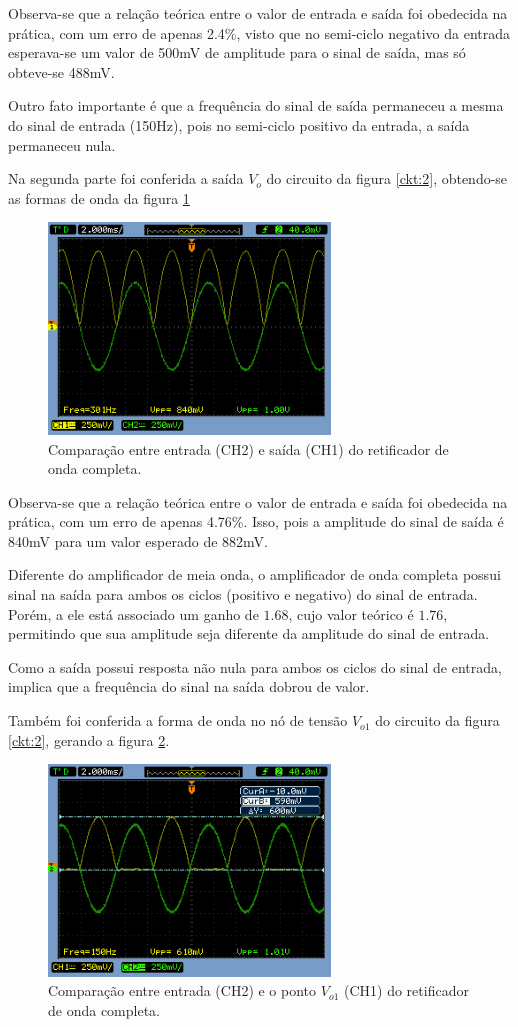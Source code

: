 Observa-se que a relação teórica entre o valor de entrada e saída foi obedecida na prática, com um erro de apenas 2.4\%, visto que no semi-ciclo negativo da entrada esperava-se um valor de 500mV de amplitude para o sinal de saída, mas só obteve-se 488mV. 

Outro fato importante é que a frequência do sinal de saída permaneceu a mesma do sinal de entrada (150Hz), pois no semi-ciclo positivo da entrada, a saída permaneceu nula.

Na segunda parte foi conferida a saída $V_o$ do circuito da figura \ref{ckt:2}, obtendo-se as formas de onda da figura \ref{fig2}

\begin{figure}[H] 
\centering
\includegraphics[width=7.5cm]{images/VO_2.png}
\caption{Comparação entre entrada (CH2) e saída (CH1) do retificador de onda completa.}
\label{fig2} 
\end{figure}

Observa-se que a relação teórica entre o valor de entrada e saída foi obedecida na prática, com um erro de apenas 4.76\%. Isso, pois a amplitude do sinal de saída é 840mV para um valor esperado de 882mV. 

Diferente do amplificador de meia onda, o amplificador de onda completa possui sinal na saída para ambos os ciclos (positivo e negativo) do sinal de entrada. Porém, a ele está associado um ganho de $1.68$, cujo valor teórico é $1.76$, permitindo que sua amplitude seja diferente da amplitude do sinal de entrada. 

Como a saída possui resposta não nula para ambos os ciclos do sinal de entrada, implica que a frequência do sinal na saída dobrou de valor.

Também foi conferida a forma de onda no nó de tensão $V_{o1}$ do circuito da figura \ref{ckt:2}, gerando a figura \ref{fig3}.

\begin{figure}[H] 
\centering
\includegraphics[width=7.5cm]{images/VO1.png}
\caption{Comparação entre entrada (CH2) e o ponto $V_{o1}$ (CH1) do retificador de onda completa.}
\label{fig3} 
\end{figure}

